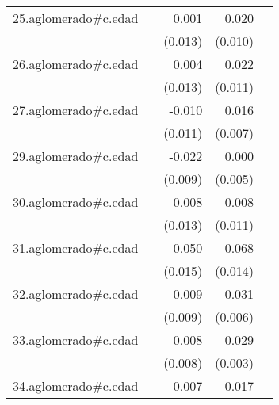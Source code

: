 {\begin{longtable}{l*{4}{D{.}{.}{-1}}}
\addlinespace
25.aglomerado#c.edad&                     &       0.001         &       0.020\sym{*}  &                     \\
            &                     &     (0.013)         &     (0.010)         &                     \\
\addlinespace
26.aglomerado#c.edad&                     &       0.004         &       0.022         &                     \\
            &                     &     (0.013)         &     (0.011)         &                     \\
\addlinespace
27.aglomerado#c.edad&                     &      -0.010         &       0.016\sym{*}  &                     \\
            &                     &     (0.011)         &     (0.007)         &                     \\
\addlinespace
29.aglomerado#c.edad&                     &      -0.022\sym{*}  &       0.000         &                     \\
            &                     &     (0.009)         &     (0.005)         &                     \\
\addlinespace
30.aglomerado#c.edad&                     &      -0.008         &       0.008         &                     \\
            &                     &     (0.013)         &     (0.011)         &                     \\
\addlinespace
31.aglomerado#c.edad&                     &       0.050\sym{**} &       0.068\sym{***}&                     \\
            &                     &     (0.015)         &     (0.014)         &                     \\
\addlinespace
32.aglomerado#c.edad&                     &       0.009         &       0.031\sym{***}&                     \\
            &                     &     (0.009)         &     (0.006)         &                     \\
\addlinespace
33.aglomerado#c.edad&                     &       0.008         &       0.029\sym{***}&                     \\
            &                     &     (0.008)         &     (0.003)         &                     \\
\addlinespace
34.aglomerado#c.edad&                     &      -0.007         &       0.017\sym{**} &                     \\

\end{longtable}}
